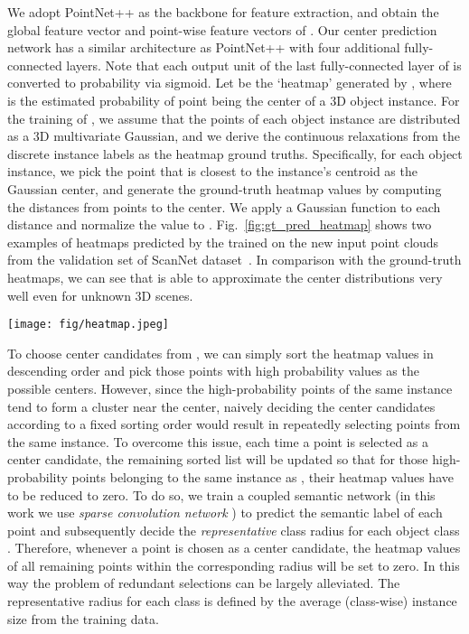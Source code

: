 \documentclass[runningheads]{llncs}
\makeatletter
\renewcommand{\paragraph}{\@startsection{paragraph}{4}{\z@}{0.5\baselineskip \@plus 0ex \@minus 0ex}{-1em}{\normalfont\normalsize\bfseries}}
\makeatother
\begin{document}
We adopt PointNet++ \cite{QiYSG17} as the backbone for feature extraction, and obtain the global feature vector and point-wise feature vectors of . Our center prediction network  has a similar architecture as PointNet++ with four additional fully-connected layers. Note that each output unit of the last fully-connected layer of  is converted to probability via sigmoid. Let  be the `heatmap' generated by , where  is the estimated probability of point  being the center of a 3D object instance.
For the training of , we assume that the points of each object instance are distributed as a 3D multivariate Gaussian, and we derive the continuous relaxations from the discrete instance labels as the heatmap ground truths. Specifically, for each object instance, we pick the point that is closest to the instance's centroid as the Gaussian center, and generate the ground-truth heatmap values by computing the distances from points to the center. We apply a Gaussian function to each distance and normalize the value to . Fig.~\ref{fig:gt_pred_heatmap} shows two examples of heatmaps predicted by the trained  on the new input point clouds from the validation set of ScanNet dataset~\cite{DaiAMMTMS17}. In comparison with the ground-truth heatmaps, we can see that  is able to approximate the center distributions very well even for unknown 3D scenes. 


\begin{figure*}[tbh]
\begin{center}
 \texttt{[image: fig/heatmap.jpeg]}
\end{center}
    \vspace{-3mm}
   \caption{Visualization of predicted and ground-truth center heatmaps on ScanNet}
\label{fig:gt_pred_heatmap}
\end{figure*}

\paragraph{Center selection mechanism.}
To choose center candidates from , we can simply sort the heatmap values  in descending order and pick those points with high probability values as the possible centers. However, since the high-probability points of the same instance tend to form a cluster near the center, naively deciding the center candidates according to a fixed sorting order would result in repeatedly selecting points from the same instance. To overcome this issue, each time a point  is selected as a center candidate, the remaining sorted list will be updated so that for those high-probability points belonging to the same instance as , their heatmap values have to be reduced to zero. To do so, we train a coupled semantic network (in this work we use {\em sparse convolution network} \cite{GrahamEM18}) to predict the semantic label of each point  and subsequently decide the {\em representative} class radius  for each object class . Therefore, whenever a point  is chosen as a center candidate, the heatmap values of all remaining points within the corresponding radius will be set to zero. In this way the problem of redundant selections can be largely alleviated. The representative radius for each class is defined by the average (class-wise) instance size from the training data.
\end{document}
